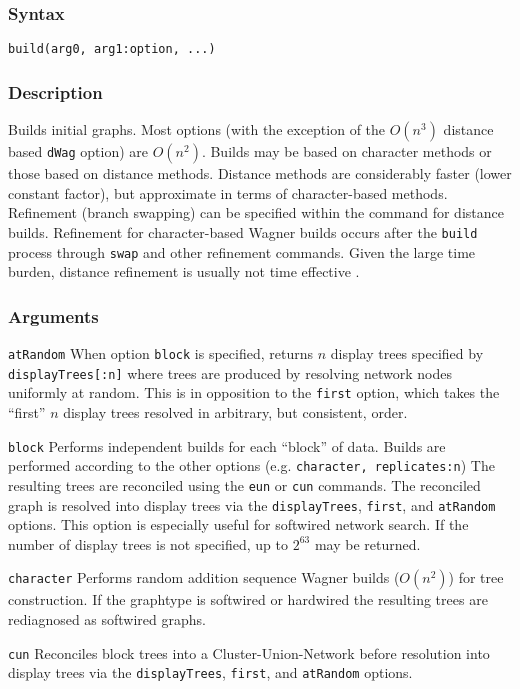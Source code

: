 \documentclass[11pt]{article}
\begin{document}
		\subsubsection{Syntax}
		\texttt{build(arg0, arg1:option, ...)}
		\subsubsection{Description}
		Builds initial graphs.  Most options (with the exception of the $O(n^3)$ distance based \texttt{dWag} option)
		are $O(n^2)$.  Builds may be based on character methods or those based on distance methods.  Distance methods are considerably faster 
		(lower constant factor), but approximate in terms of character-based methods.  Refinement (branch swapping) can be specified
		within the command for distance builds.  Refinement for character-based Wagner builds occurs after the \texttt{build} process through \texttt{swap} and
		 other refinement commands.  Given the large time burden, distance refinement is usually not time effective \citep{Wheeler2021}.
		\subsubsection{Arguments}
		\noindent \texttt{atRandom} When option \texttt{block} is specified, returns $n$ display trees specified by \texttt{displayTrees[:n]} where trees are produced by 
		resolving network nodes uniformly at random.  This is in opposition to the \texttt{first} option, which takes the ``first'' $n$ display trees  resolved in arbitrary, but consistent, order.
		
		\smallskip
		\noindent \texttt{block} Performs independent builds for each ``block'' of data.  Builds are performed according to the other options (e.g. \texttt{character, replicates:n})
		The resulting trees are reconciled using the \texttt{eun} or \texttt{cun} commands.   The reconciled graph is resolved into display trees via the \texttt{displayTrees}, \texttt{first},
		and \texttt{atRandom} options.  This option is especially useful for softwired  network search.  If the number of display trees is not specified, up to  $2^{63}$ may be returned.
		
		\smallskip
		\noindent \texttt{character} Performs random addition sequence Wagner \citep{Farris1970} builds ($O(n^2)$) for tree construction.  If the graphtype is softwired  or hardwired
		the resulting trees are rediagnosed as softwired graphs.
		
		\smallskip
		\noindent \texttt{cun} Reconciles block trees into a  Cluster-Union-Network \citep{Baroni2005} before resolution into display trees via the \texttt{displayTrees}, \texttt{first},
		and \texttt{atRandom} options.
		
\end{document}
